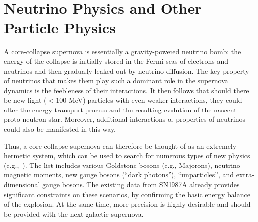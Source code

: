 


\section{Neutrino Physics and Other Particle Physics}
\label{sec:physics-snblowe-neutrino-physics}

A core-collapse supernova is essentially a gravity-powered neutrino bomb: the energy of the collapse is initially stored in the Fermi seas of electrons and neutrinos and then gradually leaked out by neutrino diffusion. The key property of neutrinos that makes them play such a dominant role in the supernova dynamics is the feebleness of their interactions. It then follows that should there be new light ($< 100$ MeV) particles with even weaker interactions, they could alter the energy transport process and the resulting evolution of the nascent proto-neutron star. Moreover, additional interactions or properties of neutrinos could also be manifested in this way. 

Thus, a core-collapse supernova can therefore be thought of as an extremely hermetic system, which can be used to search for numerous types of new physics (e.g.,~\cite{Schramm:1990pf,Raffelt:1999tx}). The list includes various Goldstone bosons (e.g., Majorons), neutrino magnetic moments, new gauge bosons (``dark photons''), ``unparticles'', and extra-dimensional gauge bosons. The existing data from SN1987A already provides significant constraints on these scenarios, by confirming the basic energy balance of the explosion. At the same time, more precision is highly desirable and should be provided with the next galactic supernova. 

